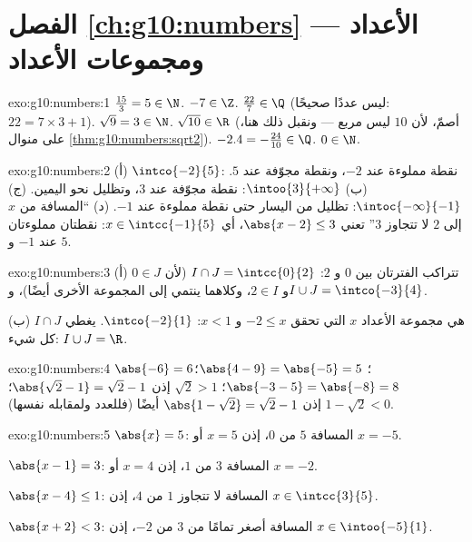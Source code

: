 \section*{الفصل \ref{ch:g10:numbers} --- الأعداد ومجموعات الأعداد}

\begin{solution}{exo:g10:numbers:1}
$\frac{15}{3} = 5 \in \N$. \quad $-7 \in \Z$. \quad
$\frac{22}{7} \in \Q$ (ليس عددًا صحيحًا: $22 = 7 \times 3 + 1$).
\quad $\sqrt 9 = 3 \in \N$. \quad $\sqrt{10} \in \R$ (أصمّ، لأن
$10$ ليس مربع  --- ونقبل ذلك هنا، على منوال
\cref{thm:g10:numbers:sqrt2}). \quad $-2.4 = -\frac{24}{10} \in \Q$.
\quad $0 \in \N$.
\end{solution}

\begin{solution}{exo:g10:numbers:2}
(أ) $\intco{-2}{5}$: نقطة مملوءة عند $-2$، ونقطة مجوّفة عند $5$.
(ب) $\intoo{3}{+\infty}$: نقطة مجوّفة عند $3$، وتظليل نحو اليمين.
(ج) $\intoc{-\infty}{-1}$: تظليل من اليسار حتى نقطة مملوءة عند
$-1$.
(د) ``المسافة من $x$ إلى $2$ لا تتجاوز $3$'' تعني $\abs{x - 2} \leq 3$،
أي $x \in \intcc{-1}{5}$: نقطتان مملوءتان عند $-1$ و $5$.
\end{solution}

\begin{solution}{exo:g10:numbers:3}
(أ) تتراكب الفترتان بين $0$ و $2$:
$I \cap J = \intcc{0}{2}$ (لأن $0 \in J$ و $2 \in I$، وكلاهما ينتمي إلى
المجموعة الأخرى أيضًا)، و$I \cup J = \intco{-3}{4}$.

(ب) $I \cap J$ هي مجموعة الأعداد $x$ التي تحقق $-2 \leq x$ و $x < 1$:
$\intco{-2}{1}$.  يغطي كل شيء: $I \cup J = \R$.
\end{solution}

\begin{solution}{exo:g10:numbers:4}
$\abs{-6} = 6$؛ \quad $\abs{4 - 9} = \abs{-5} = 5$؛ \quad
$\abs{-3 - 5} = \abs{-8} = 8$؛ \quad
$\sqrt 2 > 1$ إذن $\abs{\sqrt2 - 1} = \sqrt2 - 1$؛ \quad
$1 - \sqrt2 < 0$ إذن $\abs{1 - \sqrt2} = \sqrt2 - 1$ أيضًا (فللعدد
ولمقابله  نفسها).
\end{solution}

\begin{solution}{exo:g10:numbers:5}
$\abs{x} = 5$: المسافة $5$ من $0$، إذن $x = 5$ أو $x = -5$.

$\abs{x - 1} = 3$: المسافة $3$ من $1$، إذن $x = 4$ أو $x = -2$.

$\abs{x - 4} \leq 1$: المسافة لا تتجاوز $1$ من $4$، إذن
$x \in \intcc{3}{5}$.

$\abs{x + 2} < 3$: المسافة أصغر تمامًا من $3$ من $-2$، إذن
$x \in \intoo{-5}{1}$.
\end{solution}

